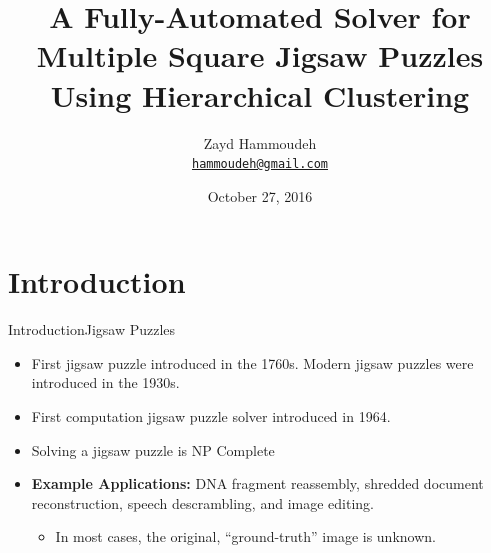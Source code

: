 \documentclass[10pt]{beamer}
\title[A Fully-Automated Solver for Multiple Square Jigsaw Puzzles Using Hierarchical Clustering]%
{\textbf{A Fully-Automated Solver for Multiple Square Jigsaw Puzzles Using Hierarchical Clustering}}
\subtitle{}  %
\date{October 27, 2016}
\author[Zayd Hammoudeh] %
{
    Zayd Hammoudeh\\
    \href{mailto:hammoudeh@gmail.com}{{\tt hammoudeh@gmail.com}}
}
\institute[
    Dept.\ of Computer Science\\
    San Jose State University\\
] %
{%
    Department of Computer Science\\
    San Jose State University\\
  
}
\begin{document}
{
\begin{frame}{}{} %
	\titlepage
\end{frame}}






\section{Introduction}
\begin{frame}{Introduction}{Jigsaw Puzzles}
  \begin{itemize}
    \item First jigsaw puzzle introduced in the 1760s.  Modern jigsaw puzzles were introduced in the 1930s.
    \vfill
    \item First computation jigsaw puzzle solver introduced in 1964.
    \vfill
    \item Solving a jigsaw puzzle is NP Complete \cite{altman1990, demaine2007}
    \vfill
    \item<2-> \textbf{Example Applications:} DNA fragment reassembly, shredded document reconstruction, speech descrambling, and image editing.
    \begin{itemize}
        \item<3-> In most cases, the original, ``ground-truth'' image is unknown.
    \end{itemize}
  \end{itemize}
\end{frame}
\end{document}
